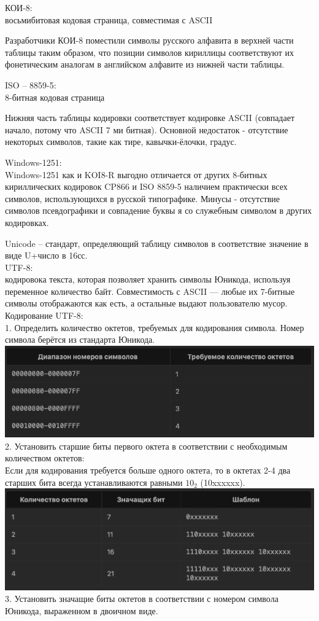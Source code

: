 \documentclass{article}
\begin{document}
КОИ-8:\\
восьмибитовая кодовая страница, совместимая с ASCII 

Разработчики КОИ-8 поместили символы русского алфавита в верхней части таблицы таким образом, 
что позиции символов кириллицы соответствуют их фонетическим аналогам в английском алфавите из нижней части таблицы.


ISO – 8859-5:\\
8-битная кодовая страница

Нижняя часть таблицы кодировки соответствует кодировке ASCII (совпадает начало, потому что ASCII 7 ми битная). 
Основной недостаток - отсутствие некоторых символов, такие как тире, кавычки-ёлочки, градус.


Windows-1251:\\
Windows-1251 как и KOI8-R выгодно отличается от других 8‑битных кириллических кодировок CP866 и ISO 8859-5 наличием практически всех символов, использующихся в русской типографике.
Минусы - отсутствие символов псевдографики и совпадение буквы я со служебным символом в других кодировках.


Unicode – стандарт, определяющий таблицу символов в соответствие значение в виде U+число в 16сс. 
\\UTF-8:\\
кодировока текста, которая позволяет хранить символы Юникода, используя переменное количество байт. 
Совместимость с ASCII — любые их 7-битные символы отображаются как есть, а остальные выдают пользователю мусор.
\\Кодирование UTF-8:\\
1. Определить количество октетов, требуемых для кодирования символа. Номер символа берётся из стандарта Юникода.\\
\includegraphics[width=.7\textwidth]{utf81.png}\\
2. Установить старшие биты первого октета в соответствии с необходимым 
количеством октетов:\\
Если для кодирования требуется больше одного октета, то в октетах 2-4 два 
старших бита всегда устанавливаются равными $10_2$ (10xxxxxx).\\
\includegraphics[width=.7\textwidth]{utf82.png}\\
3. Установить значащие биты октетов в соответствии с номером символа Юникода, 
выраженном в двоичном виде.
\end{document}

